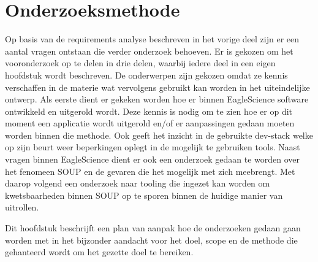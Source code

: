 \chapter{Onderzoeksmethode}\label{ch:onderzoeksmethode} %

Op basis van de requirements analyse beschreven in het vorige deel zijn er een aantal vragen ontstaan die verder onderzoek behoeven. Er is gekozen om het vooronderzoek op te delen in drie delen, waarbij iedere deel in een eigen hoofdstuk wordt beschreven. De onderwerpen zijn gekozen omdat ze kennis verschaffen in de materie wat vervolgens gebruikt kan worden in het uiteindelijke ontwerp.
Als eerste dient er gekeken worden hoe er binnen EagleScience software ontwikkeld en uitgerold wordt. Deze kennis is nodig om te zien hoe er op dit moment een applicatie wordt uitgerold en/of er aanpassingen gedaan moeten worden binnen die methode. Ook geeft het inzicht in de gebruikte dev-stack welke op zijn beurt weer beperkingen oplegt in de mogelijk te gebruiken tools. Naast vragen binnen EagleScience dient er ook een onderzoek gedaan te worden over het fenomeen SOUP en de gevaren die het mogelijk met zich meebrengt. Met daarop volgend een onderzoek naar tooling die ingezet kan worden om kwetsbaarheden binnen SOUP op te sporen binnen de huidige manier van uitrollen.

Dit hoofdstuk beschrijft een plan van aanpak hoe de onderzoeken gedaan gaan worden met in het bijzonder aandacht voor het doel, scope en de methode die gehanteerd wordt om het gezette doel te bereiken.

%



